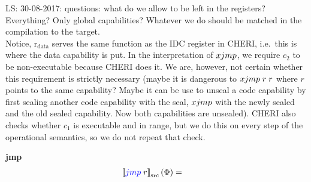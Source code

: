 \documentclass[a4paper]{article}
\newcommand\lau[1]{{\color{purple} \sf \footnotesize {LS: #1}}\\}
\newcommand{\sem}[1]{\left\llbracket #1 \right\rrbracket}
\newcommand{\ssem}[2][\Phi]{\sem{#2}_{\mathrm{src}}(#1)}
\newcommand{\sourcecolor}[1]{\color{blue}}
\newcommand{\src}[1]{{\sourcecolor{} #1}}
\newcommand{\targetcolor}[1]{\color{black}}
\newcommand{\trg}[1]{{\targetcolor{} #1}}
\newcommand{\zinstr}[1]{#1}
\newcommand{\oneinstr}[2]{
  \ifthenelse{\equal{#2}{}}
  {\zinstr{#1}}
  {\zinstr{#1} \; #2}
}
\newcommand{\twoinstr}[3]{
  \ifthenelse{\equal{#2#3}{}}
  {\zinstr{#1}}
  {\zinstr{#1} \; #2 \; #3}
}
\newcommand{\sjmp}[1]{\oneinstr{\src{jmp}}{#1}}
\newcommand{\sxjmp}[2]{\twoinstr{\trg{xjmp}}{#1}{#2}}
\newcommand{\rdata}{\mathrm{r}_\mathrm{data}}
\begin{document}
\lau{30-08-2017: questions: what do we allow to be left in the registers? Everything? Only global capabilities? Whatever we do should be matched in the compilation to the target.}

Notice, $\rdata$ serves the same function as the IDC register in CHERI, i.e.\ this is where the data capability is put. In the interpretation of $\sxjmp{}{}$, we require $c_2$ to be non-executable because CHERI does it. We are, however, not certain whether this requirement is strictly necessary (maybe it is dangerous to $\sxjmp{r}{r}$ where $r$ points to the same capability? Maybe it can be use to unseal a code capability by first sealing another code capability with the seal, $\sxjmp{}{}$ with the newly sealed and the old sealed capability. Now both capabilities are unsealed). CHERI also checks whether $c_1$ is executable and in range, but we do this on every step of the operational semantics, so we do not repeat that check.

\textbf{jmp}\\
\begin{align*}
  \ssem{\sjmp{r}} = & 
\end{align*}
\end{document}
